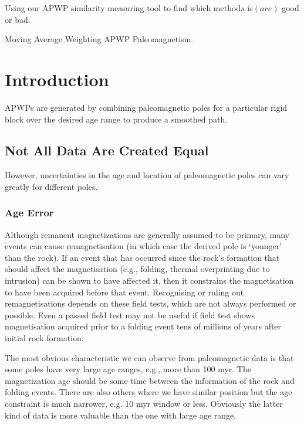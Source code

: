 \begin{summary}
Using our APWP similarity measuring tool to find which method\(s\) is$(are)$
good or bad.
\end{summary}

\begin{keywords}
  Moving Average \textendash{} Weighting \textendash{} APWP \textendash{}
  Paleomagnetism.
\end{keywords}

\section{Introduction}

APWPs are generated by combining paleomagnetic poles for a particular rigid
block over the desired age range to produce a smoothed path.

\subsection{Not All Data Are Created Equal}

However, uncertainties in the age and location of paleomagnetic poles can vary
greatly for different poles.

\subsubsection{Age Error}

Although remanent magnetizations are generally assumed to be primary, many
events can cause remagnetisation (in which case the derived pole is `younger'
than the rock). If an event that has occurred since the rock's formation that
should affect the magnetisation (e.g., folding, thermal overprinting due to
intrusion) can be shown to have affected it, then it constrains the
magnetisation to have been acquired before that event. Recognising or ruling
out remagnetisations depends on these field tests, which are not always
performed or possible. Even a passed field test may not be useful if field test
shows magnetisation acquired prior to a folding event tens of millions of years
after initial rock formation.

The most obvious characteristic we can observe from paleomagnetic data is that
some poles have very large age ranges, e.g., more than 100 myr. The
magnetization age should be some time between the information of the rock and
folding events. There are also others where we have similar position but the
age constraint is much narrower, e.g. 10 myr window or less. Obviously the
latter kind of data is more valuable than the one with large age range.

